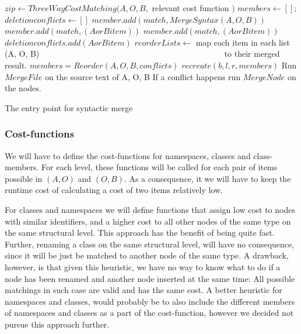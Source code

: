 \documentclass[11pt]{article}
\begin{document}
\begin{algorithm}
\begin{algorithmic}
        \State $zip  \gets ThreeWayCostMatching(A, O, B, $ relevant cost function $)$
        \State $members \gets [];$
        \State $deletionconflicts \gets []$
               \State $member.add(match, MergeSyntax(A, O, B)) $
              \State $member.add(match, (A or B item))$
               \State $member.add(match, (A or B item))$
               \State $deletionconflicts.add(A or B item)$
           \EndIf
           \State $reorderLists \gets $ map each item in each list (A, O, B)
           \State ~~~~~~~~~~~~~~~~~~~~~~~~~~~~~~~~~~~~~~~~~~~~ to their merged result.
           \State $members = Reorder(A, O, B, conflicts)$
       \EndFor
       \State \Return $recreate(b, l, r, members)$
       \State Run $MergeFile$ on the source text of A, O, B
       \State If a conflict happens run $MergeNode$ on the nodes.
    \EndIf
\EndFunction
\end{algorithmic}
\caption{The entry point for syntactic merge}
\label{TreeMergeAlgorithm}
\end{algorithm}

\subsubsection{Cost-functions}
We will have to define the cost-functions for namespaces, classes and class-members. For each level, these functions will be called for each pair of items possible in $(A, O)$ and $(O, B)$. As a consequence, it we will have to keep the runtime cost of calculating a cost of two items relatively low.

For classes and namespaces we will define functions that assign low cost to nodes with similar identifiers, and a higher cost to all other nodes of the same type on the same structural level. This approach has the benefit of being quite fast. Further, renaming a class on the same structural level, will have no consequence, since it will be just be matched to another node of the same type. A drawback, however, is that given this heuristic, we have no way to know what to do if a node has been renamed and another node inserted at the same time: All possible matchings in such case are valid and has the same cost. A better heuristic for namespaces and classes, would probably be to also include the different members of namespaces and classes as a part of the cost-function, however we decided not pursue this approach further.
\end{document}
